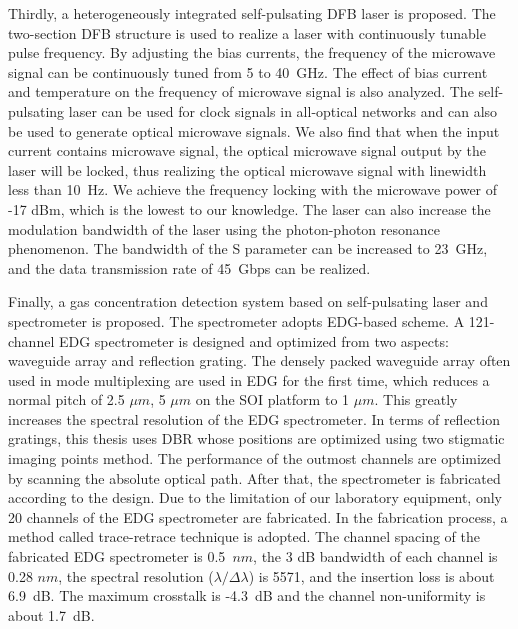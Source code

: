 \begin{englishabstract}
Thirdly, a heterogeneously integrated self-pulsating DFB laser is proposed. The two-section DFB structure is used to realize a laser with continuously tunable pulse frequency. By adjusting the bias currents, the frequency of the microwave signal can be continuously tuned from 5 to 40~GHz. The effect of bias current and temperature on the frequency of microwave signal is also analyzed. The self-pulsating laser can be used for clock signals in all-optical networks and can also be used to generate optical microwave signals. We also find that when the input current contains microwave signal, the optical microwave signal output by the laser will be locked, thus realizing the optical microwave signal with linewidth less than 10~Hz. We achieve the frequency locking with the microwave power of -17 dBm, which is the lowest to our knowledge. The laser can also increase the modulation bandwidth of the laser using the photon-photon resonance phenomenon. The bandwidth of the S parameter can be increased to 23~GHz, and the data transmission rate of 45~Gbps can be realized.

Finally, a gas concentration detection system based on self-pulsating laser and spectrometer is proposed. The spectrometer adopts EDG-based scheme. A 121-channel EDG spectrometer is designed and optimized from two aspects: waveguide array and reflection grating. The densely packed waveguide array often used in mode multiplexing are used in EDG for the first time, which reduces a normal pitch of 2.5 $\mu m$, 5 $\mu m$ on the SOI platform to 1 $\mu m$. This greatly increases the spectral resolution of the EDG spectrometer. In terms of reflection gratings, this thesis uses DBR whose positions are optimized using two stigmatic imaging points method. The performance of the outmost channels are optimized by scanning the absolute optical path. After that, the spectrometer is fabricated according to the design. Due to the limitation of our laboratory equipment, only 20 channels of the EDG spectrometer are fabricated. In the fabrication process, a method called trace-retrace technique is adopted. The channel spacing of the fabricated EDG spectrometer is 0.5~$nm$, the 3 dB bandwidth of each channel is 0.28 $nm$, the spectral resolution ($\lambda/\Delta\lambda$) is 5571, and the insertion loss is about 6.9~dB. The maximum crosstalk is -4.3~dB and the channel non-uniformity is about 1.7~dB.


\end{englishabstract}
